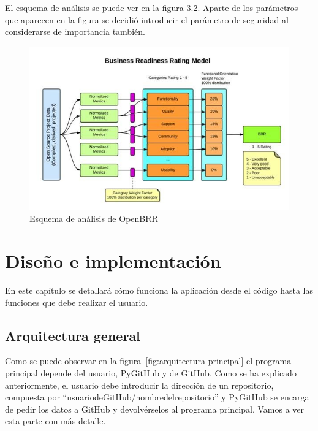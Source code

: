 \documentclass[a4paper, 12pt]{book}
\begin{document}
El esquema de análisis se puede ver en la figura 3.2. Aparte de los parámetros que aparecen en la figura se decidió introducir el parámetro de seguridad al considerarse de importancia también.

\begin{figure}
  \centering
  \includegraphics[width=14cm, keepaspectratio]{img/openbrr.png}
  \caption{Esquema de análisis de OpenBRR}\label{fig:OpenBRR}
\end{figure}



\cleardoublepage
\chapter{Diseño e implementación}
\label{chap:diseño}

En este capítulo se detallará cómo funciona la aplicación desde el código hasta las funciones que debe realizar el usuario.

\section{Arquitectura general} 
\label{sec:arquitectura}

Como se puede observar en la figura~\ref{fig:arquitectura principal} el programa principal depende del usuario, PyGitHub y de GitHub. Como se ha explicado anteriormente, el usuario debe introducir la dirección de un repositorio, compuesta por ``usuario\textunderscore de\textunderscore GitHub/nombre\textunderscore del\textunderscore repositorio'' y PyGitHub se encarga de pedir los datos a GitHub y devolvérselos al programa principal. Vamos a ver esta parte con más detalle.
\end{document}
